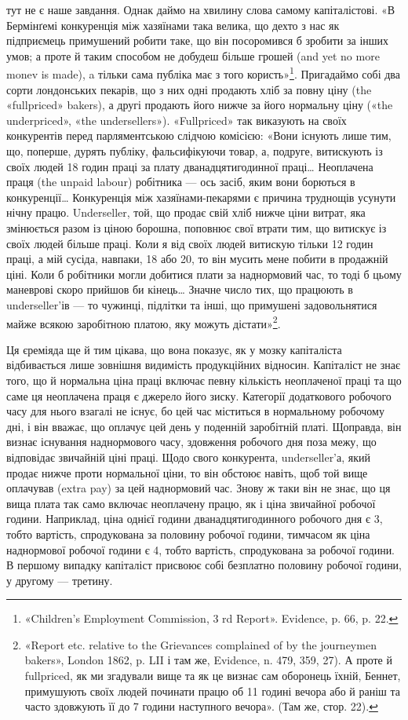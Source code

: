 тут не є наше завдання. Однак даймо на хвилину слова
самому капіталістові. «В Бермінґемі конкуренція між хазяїнами
така велика, що дехто з нас як підприємець примушений робити
таке, що він посоромився б зробити за інших умов; а проте й
таким способом не добудеш більше грошей (and yet no more
monev is made), a тільки сама публіка має з того користь»\footnote{
«Children’s Employment Commission, 3 rd Report». Evidence, p. 66, p. 22.
}.
Пригадаймо собі два сорти лондонських пекарів, що з них одні
продають хліб за повну ціну (the «fullpriced» bakers), а другі
продають його нижче за його нормальну ціну («the underpriced»,
«the undersellers»). «Fullpriced» так виказують на своїх
конкурентів перед парляментською слідчою комісією: «Вони
існують лише тим, що, поперше, дурять публіку, фальсифікуючи
товар, а, подруге, витискують із своїх людей 18 годин праці
за плату дванадцятигодинної праці\dots{} Неоплачена праця (the
unpaid labour) робітника — ось засіб, яким вони борються в
конкуренції\dots{} Конкуренція між хазяїнами-пекарями є причина
труднощів усунути нічну працю. Underseller, той, що продає
свій хліб нижче ціни витрат, яка змінюється разом із ціною
борошна, поповнює свої втрати тим, що витискує із своїх людей
більше праці. Коли я від своїх людей витискую тільки 12 годин
праці, а мій сусіда, навпаки, 18 або 20, то він мусить мене побити
в продажній ціні. Коли б робітники могли добитися плати за
наднормовий час, то тоді б цьому маневрові скоро прийшов би
кінець\dots{} Значне число тих, що працюють в underseller’ів — то
чужинці, підлітки та інші, що примушені задовольнятися майже
всякою заробітною платою, яку можуть дістати»\footnote{
«Report etc. relative to the Grievances complained of by the
journeymen bakers», London 1862, p. LII і там же, Evidence, n. 479,
359, 27). А проте й fullpriced, як ми згадували вище та як це визнає сам
оборонець їхній, Беннет, примушують своїх людей починати працю об
11 годині вечора або й раніш та часто здовжують її до 7 години наступного
вечора». (Там же, стор. 22).
}.

Ця єреміяда ще й тим цікава, що вона показує, як у мозку
капіталіста відбивається лише зовнішня видимість продукційних
відносин. Капіталіст не знає того, що й нормальна ціна праці
включає певну кількість неоплаченої праці та що саме ця неоплачена
праця є джерело його зиску. Категорії додаткового робочого
часу для нього взагалі не існує, бо цей час міститься в нормальному
робочому дні, і він вважає, що оплачує цей день у поденній
заробітній платі. Щоправда, він визнає існування наднормового
часу, здовження робочого дня поза межу, що відповідає звичайній
ціні праці. Щодо свого конкурента, underseller’а, який продає
нижче проти нормальної ціни, то він обстоює навіть, щоб той
вище оплачував (extra pay) за цей наднормовий час. Знову ж
таки він не знає, що ця вища плата так само включає неоплачену
працю, як і ціна звичайної робочої години. Наприклад,
ціна однієї години дванадцятигодинного робочого дня є 3,
тобто вартість, спродукована за половину робочої години, тимчасом
як ціна наднормової робочої години є 4, тобто вартість,
спродукована за  робочої години. В першому випадку капіталіст
присвоює собі безплатно половину робочої години, у
другому — третину.

